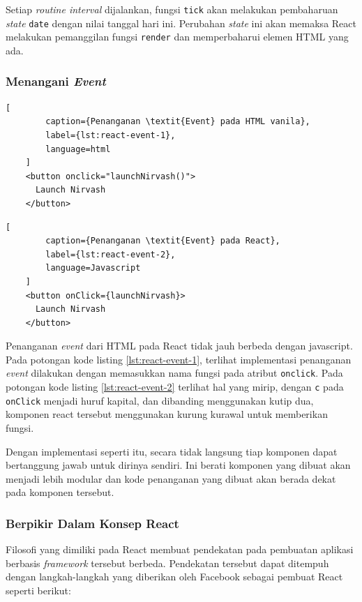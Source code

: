     Setiap \textit{routine interval} dijalankan, fungsi \texttt{tick} akan melakukan pembaharuan \textit{state} \texttt{date} dengan nilai tanggal hari ini.
    Perubahan \textit{state} ini akan memaksa React melakukan pemanggilan fungsi \texttt{render} dan memperbaharui elemen HTML yang ada.
    
    \subsubsection{Menangani \textit{Event}}
    \begin{lstlisting}[
        caption={Penanganan \textit{Event} pada HTML vanila}, 
        label={lst:react-event-1}, 
        language=html
    ]
    <button onclick="launchNirvash()">
      Launch Nirvash
    </button>
    \end{lstlisting}
    
    \begin{lstlisting}[
        caption={Penanganan \textit{Event} pada React}, 
        label={lst:react-event-2}, 
        language=Javascript
    ]
    <button onClick={launchNirvash}>
      Launch Nirvash
    </button>
    \end{lstlisting}
    
    Penanganan \textit{event} dari HTML pada React tidak jauh berbeda dengan javascript. Pada potongan kode listing \ref{lst:react-event-1}, terlihat implementasi penanganan \textit{event} dilakukan dengan memasukkan nama fungsi pada atribut \texttt{onclick}. Pada potongan kode listing \ref{lst:react-event-2} terlihat hal yang mirip, dengan \texttt{c} pada \texttt{onClick} menjadi huruf kapital, dan dibanding menggunakan kutip dua, komponen react tersebut menggunakan kurung kurawal untuk memberikan fungsi.
    
    Dengan implementasi seperti itu, secara tidak langsung tiap komponen dapat bertanggung jawab untuk dirinya sendiri. Ini berati komponen yang dibuat akan menjadi lebih modular dan kode penanganan yang dibuat akan berada dekat pada komponen tersebut.
    
    
    \subsubsection{Berpikir Dalam Konsep React}
    Filosofi yang dimiliki pada React membuat pendekatan pada pembuatan aplikasi berbasis \textit{framework} tersebut berbeda. Pendekatan tersebut dapat ditempuh dengan langkah-langkah yang diberikan oleh Facebook sebagai pembuat React\cite{facebook:react-thinking-in-react} seperti berikut:
    
